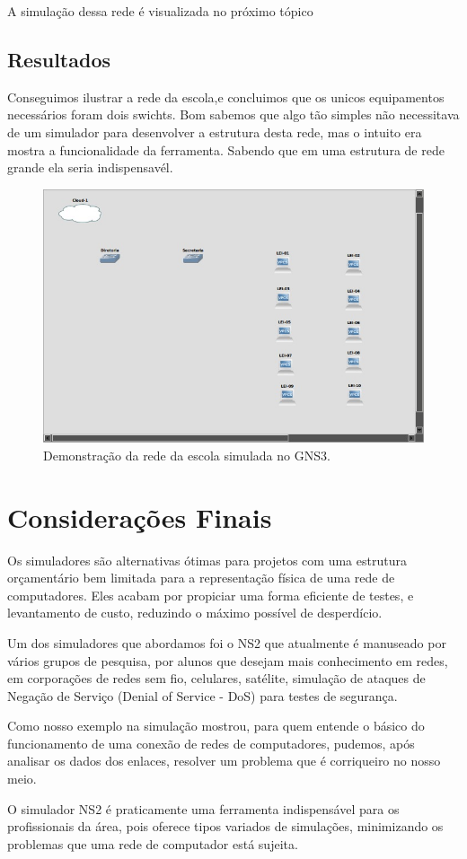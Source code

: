 \documentclass[12pt]{article}
\begin{document}
A simulação dessa rede é visualizada no próximo tópico
\subsection{Resultados}
Conseguimos ilustrar a rede da escola,e concluimos que os unicos equipamentos necessários foram dois swichts. Bom sabemos que algo tão simples não necessitava de um simulador para desenvolver a estrutura desta rede, mas o intuito era mostra a funcionalidade da ferramenta. Sabendo que em uma estrutura de rede grande ela seria indispensavél.   
\begin{figure}[ht]
\centering
\includegraphics[width=.9\textwidth]{estrutura.jpeg}
\caption { Demonstração da rede da escola simulada no GNS3.}
\label{fig:gargalo}
\end{figure}

\section{Considerações Finais}\label{sec:figs}
 Os simuladores são alternativas ótimas para projetos com uma estrutura orçamentário bem limitada para a representação física de uma rede de computadores. Eles acabam por propiciar uma forma eficiente de testes, e levantamento de custo, reduzindo o máximo possível de desperdício.
 
Um dos simuladores que abordamos foi o NS2 que atualmente é manuseado por vários grupos de pesquisa, por alunos que desejam mais conhecimento em redes, em corporações de redes sem fio, celulares, satélite, simulação de ataques de Negação de Serviço (Denial of Service - DoS) para testes de segurança.

Como nosso exemplo na simulação mostrou, para quem entende o básico do funcionamento de uma conexão de redes de computadores, pudemos, após analisar os dados dos enlaces, resolver um problema que é corriqueiro no nosso meio.

O simulador NS2 é praticamente uma ferramenta indispensável para os profissionais da área, pois oferece tipos variados de simulações, minimizando os problemas que uma rede de computador está sujeita.


\end{document}
